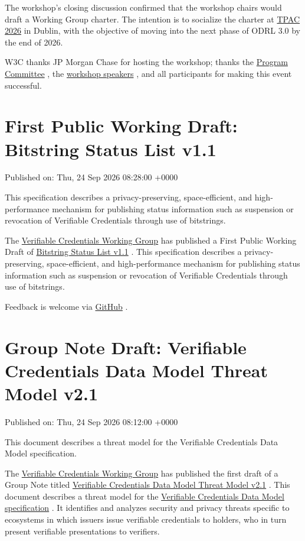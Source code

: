 \documentclass[11pt,a4paper]{article}
\begin{document}
The workshop's closing discussion confirmed that the workshop chairs would draft a Working Group charter. The intention is to socialize the charter at \href{https://www.w3.org/news-events/tpac/2026/}{TPAC 2026} in Dublin, with the objective of moving into the next phase of ODRL 3.0 by the end of 2026.

W3C thanks JP Morgan Chase for hosting the workshop; thanks the \href{https://www.w3.org/2026/ODRLWS/index.html\#program-committee}{Program Committee} , the \href{https://www.w3.org/2026/ODRLWS/agenda.html}{workshop speakers} , and all participants for making this event successful.

\section{First Public Working Draft: Bitstring Status List v1.1}

Published on: Thu, 24 Sep 2026 08:28:00 +0000

This specification describes a privacy-preserving, space-efficient, and high-performance mechanism for publishing status information such as suspension or revocation of Verifiable Credentials through use of bitstrings.

The \href{https://www.w3.org/groups/wg/vc}{Verifiable Credentials Working Group} has published a First Public Working Draft of \href{https://www.w3.org/TR/2026/WD-vc-bitstring-status-list-1.1-20260924/}{Bitstring Status List v1.1} . This specification describes a privacy-preserving, space-efficient, and high-performance mechanism for publishing status information such as suspension or revocation of Verifiable Credentials through use of bitstrings.

Feedback is welcome via \href{https://github.com/w3c/vc-bitstring-status-list/}{GitHub} .

\section{Group Note Draft: Verifiable Credentials Data Model Threat Model v2.1}

Published on: Thu, 24 Sep 2026 08:12:00 +0000

This document describes a threat model for the Verifiable Credentials Data Model specification.

The \href{https://www.w3.org/groups/wg/vc}{Verifiable Credentials Working Group} has published the first draft of a Group Note titled \href{https://www.w3.org/TR/2026/DNOTE-vc-data-model-threat-model-2.1-20260924/}{Verifiable Credentials Data Model Threat Model v2.1} . This document describes a threat model for the \href{https://www.w3.org/TR/vc-data-model/}{Verifiable Credentials Data Model specification} . It identifies and analyzes security and privacy threats specific to ecosystems in which issuers issue verifiable credentials to holders, who in turn present verifiable presentations to verifiers.
\end{document}
